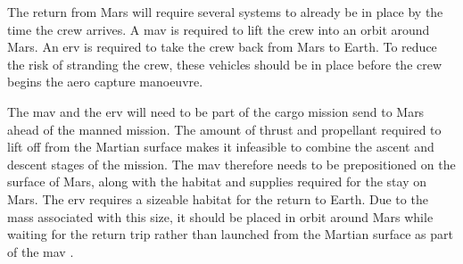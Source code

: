 The return from Mars will require several systems to already be in place by the time the crew arrives. A \gls{mav} is required to lift the crew into an orbit around Mars. An \gls{erv} is required to take the crew back from Mars to Earth. To reduce the risk of stranding the crew, these vehicles should be in place before the crew begins the aero capture manoeuvre. 

The \gls{mav} and the \gls{erv} will need to be part of the cargo mission send to Mars ahead of the manned mission. The amount of thrust and propellant required to lift off from the Martian surface makes it infeasible to combine the ascent and descent stages of the mission. The \gls{mav} therefore needs to be prepositioned on the surface of Mars, along with the habitat and  supplies required for the stay on Mars. The \gls{erv} requires a sizeable habitat for the return to Earth. Due to the mass associated with this size, it should be placed in orbit around Mars while waiting for the return trip rather than launched from the Martian surface as part of the \gls{mav} \cite{hoffman1997}.